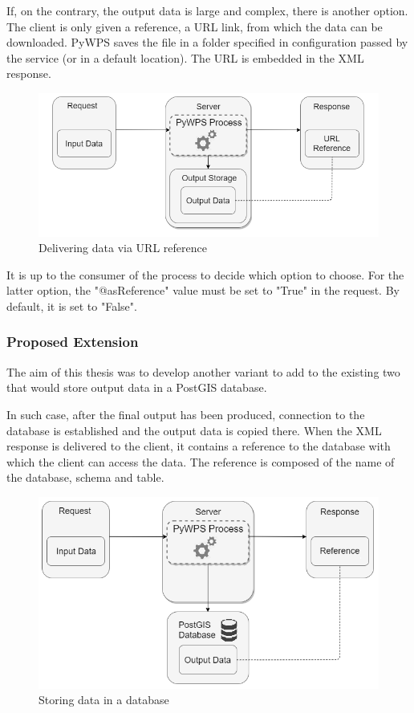 If, on the contrary, the output data is large and complex, there is another option. The client is only given a reference, a URL link, from which the data can be downloaded. PyWPS saves the file in a folder specified in configuration passed by the service (or in a default location). The URL is embedded in the XML response.\cite{pywpsurl}

\begin{figure}[H] \centering
      \includegraphics[width=370pt]{./pictures/optiontwo.png}
      \caption[Delivering data via URL reference]{Delivering data via URL reference}
      \label{fig:optiontwo}
  \end{figure}

It is up to the consumer of the process to decide which option to choose. For the latter option, the  "@asReference" value must be set to "True" in the request. By default, it is set to "False".


\subsubsection{Proposed Extension } 

The aim of this thesis was to develop another variant to add to the existing two that would store output data in a PostGIS database.

In such case, after the final output has been produced, connection to the database is established and the output data is copied there. When the XML response is delivered to the client, it contains a reference to the database with which the client can access the data. The reference is composed of the name of the database, schema and table. 

\begin{figure}[H] \centering
      \includegraphics[width=350pt]{./pictures/newoption.png}
      \caption[Storing data in a database]{Storing data in a database}
      \label{fig:newoption}
  \end{figure}

